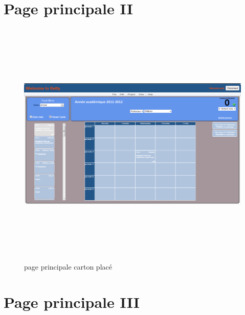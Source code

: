 \newpage

\section{Page principale II}
\label{annexe/espace_nom}

\begin{figure}[!h]
	\begin{center}
		\includegraphics[width=19cm,height=12cm,angle=90]{MainPagePlacedCard.png}
		\caption{page principale carton placé}
	\end{center}
\end{figure}

\newpage

\section{Page principale III}
\label{annexe/espace_nom}

